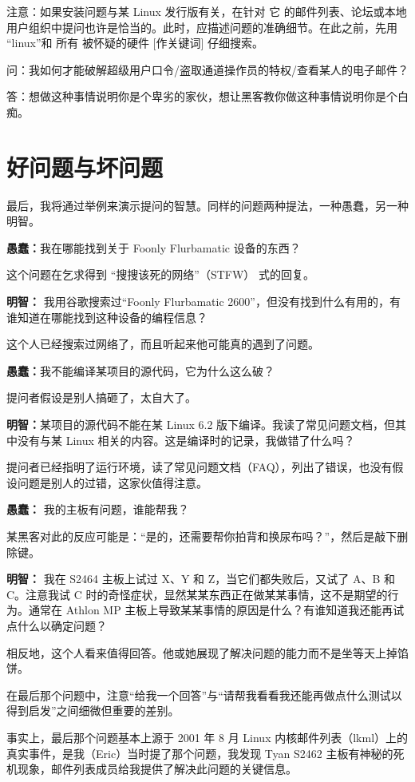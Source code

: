 注意：如果安装问题与某 Linux 发行版有关，在针对 它 的邮件列表、论坛或本地用户组织中提问也许是恰当的。此时，应描述问题的准确细节。在此之前，先用 “linux”和 所有 被怀疑的硬件 [作关键词] 仔细搜索。

问：我如何才能破解超级用户口令/盗取通道操作员的特权/查看某人的电子邮件？

答：想做这种事情说明你是个卑劣的家伙，想让黑客教你做这种事情说明你是个白痴。



\section{好问题与坏问题}


最后，我将通过举例来演示提问的智慧。同样的问题两种提法，一种愚蠢，另一种明智。

\textbf{愚蠢：}我在哪能找到关于 Foonly Flurbamatic 设备的东西？

这个问题在乞求得到 “搜搜该死的网络”（STFW） 式的回复。

\textbf{明智： }我用谷歌搜索过“Foonly Flurbamatic 2600”，但没有找到什么有用的，有谁知道在哪能找到这种设备的编程信息？

这个人已经搜索过网络了，而且听起来他可能真的遇到了问题。

\textbf{愚蠢：}我不能编译某项目的源代码，它为什么这么破？

提问者假设是别人搞砸了，太自大了。

\textbf{明智：}某项目的源代码不能在某 Linux 6.2 版下编译。我读了常见问题文档，但其中没有与某 Linux 相关的内容。这是编译时的记录，我做错了什么吗？

提问者已经指明了运行环境，读了常见问题文档（FAQ），列出了错误，也没有假设问题是别人的过错，这家伙值得注意。

\textbf{愚蠢：} 我的主板有问题，谁能帮我？

某黑客对此的反应可能是：“是的，还需要帮你拍背和换尿布吗？”，然后是敲下删除键。

\textbf{明智：} 我在 S2464 主板上试过 X、Y 和 Z，当它们都失败后，又试了 A、B 和 C。注意我试 C 时的奇怪症状，显然某某东西正在做某某事情，这不是期望的行为。通常在 Athlon MP 主板上导致某某事情的原因是什么？有谁知道我还能再试点什么以确定问题？

相反地，这个人看来值得回答。他或她展现了解决问题的能力而不是坐等天上掉馅饼。

在最后那个问题中，注意“给我一个回答”与“请帮我看看我还能再做点什么测试以得到启发”之间细微但重要的差别。

事实上，最后那个问题基本上源于 2001 年 8 月 Linux 内核邮件列表（lkml）上的真实事件，是我（Eric）当时提了那个问题，我发现 Tyan S2462 主板有神秘的死机现象，邮件列表成员给我提供了解决此问题的关键信息。

